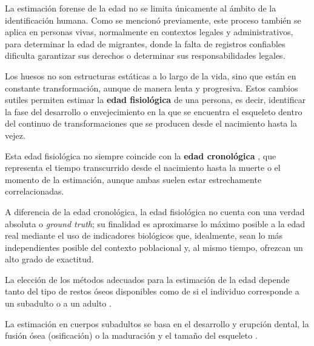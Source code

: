 
La estimación forense de la edad no se limita únicamente al ámbito de la identificación humana. 
Como se mencionó previamente, este proceso también se aplica en personas vivas, normalmente en 
contextos legales y administrativos, para determinar la edad de migrantes, donde la falta de 
registros confiables dificulta garantizar sus derechos o determinar sus responsabilidades legales.

Los huesos no son estructuras estáticas a lo largo de la vida, sino que están en constante transformación, aunque 
de manera lenta y progresiva. Estos cambios sutiles permiten estimar la \textbf{edad fisiológica} 
\cite[cap. 9]{byers2023} de una persona, es decir, identificar la fase del desarrollo o envejecimiento en la que se 
encuentra el esqueleto dentro del continuo de transformaciones que se producen desde el nacimiento hasta la vejez.

Esta edad fisiológica no siempre coincide con la \textbf{edad cronológica} \cite[cap. 9]{byers2023}, que representa 
el tiempo transcurrido desde el nacimiento hasta la muerte o el momento de la estimación, aunque ambas suelen estar 
estrechamente correlacionadas.

A diferencia de la edad cronológica, la edad fisiológica no cuenta con una verdad absoluta o \textit{ground truth}; su 
finalidad es aproximarse lo máximo posible a la edad real mediante el uso de indicadores biológicos que, idealmente, 
sean lo más independientes posible del contexto poblacional y, al mismo tiempo, ofrezcan un alto grado de exactitud.

La elección de los métodos adecuados para la estimación de la edad depende tanto del tipo de restos óseos 
disponibles como de si el individuo corresponde a un subadulto o a un adulto \cite{ubelaker2019}. 

La estimación en cuerpos subadultos se basa en el desarrollo y erupción dental, la fusión ósea (osificación)
o la maduración y el tamaño del esqueleto \cite{scheuer2000}.


